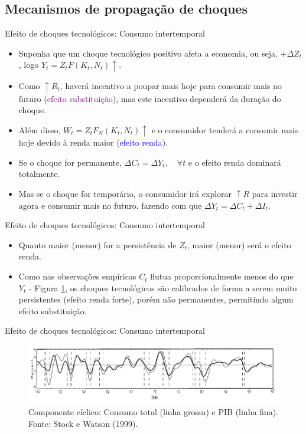 \documentclass[10pt]{beamer}
\begin{document}
\subsection{Mecanismos de propagação de choques}
\begin{frame}{Efeito de choques tecnológicos: Consumo intertemporal}
    \begin{itemize}
        \item Suponha que um choque tecnológico positivo afeta a economia, ou seja, $+\Delta Z_t$, logo $Y_t = Z_tF(K_t,N_t) \uparrow$.
        \bigskip
        \item Como $\uparrow R_t$, haverá incentivo a poupar mais hoje para consumir mais no futuro (\textcolor{purple}{efeito substituição}), mas este incentivo dependerá da duração do choque.
        \bigskip
        \item Além disso, $W_t = Z_t F_N(K_t,N_t) \uparrow$ e o consumidor tenderá a consumir mais hoje devido à renda maior (\textcolor{blue}{efeito renda}).
        \bigskip
        \item Se o choque for permanente, $\Delta C_t = \Delta Y_t, \quad \forall t$ e o efeito renda dominará totalmente.
        \bigskip
        \item Mas se o choque for temporário, o consumidor irá explorar $\uparrow R$ para investir agora e consumir mais no futuro, fazendo com que $\Delta Y_t = \Delta C_t + \Delta I_t$.
    \end{itemize}
\end{frame}

\begin{frame}{Efeito de choques tecnológicos: Consumo intertemporal}
    \begin{itemize}
        \item Quanto maior (menor) for a persistência de $Z_t$, maior (menor) será o efeito renda.
        \bigskip
        \item Como nas observações empíricas $C_t$ flutua proporcionalmente menos do que $Y_t$ - Figura \ref{fig6}, os choques tecnológicos são calibrados de forma a serem muito persistentes (efeito renda forte), porém não permanentes, permitindo algum efeito substituição.
    \end{itemize}
\end{frame}

\begin{frame}{Efeito de choques tecnológicos: Consumo intertemporal}
    \begin{figure}
        \centering
        \includegraphics[width=1\textwidth]{./figures/aula14_fig6.PNG}
        \caption{Componente cíclico: Consumo total (linha grossa) e PIB (linha fina). Fonte: Stock e Watson (1999).}
        \label{fig6}
    \end{figure}
\end{frame}
\end{document}
